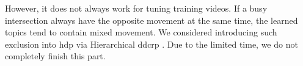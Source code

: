 However, it does not always work for tuning training videos. 
If a busy intersection always have the opposite movement at the same time, the learned topics tend to contain mixed movement.
We considered introducing such exclusion into \gls{hdp} via Hierarchical \gls{ddcrp} \cite{blei2011distance}.
Due to the limited time, we do not completely finish this part.